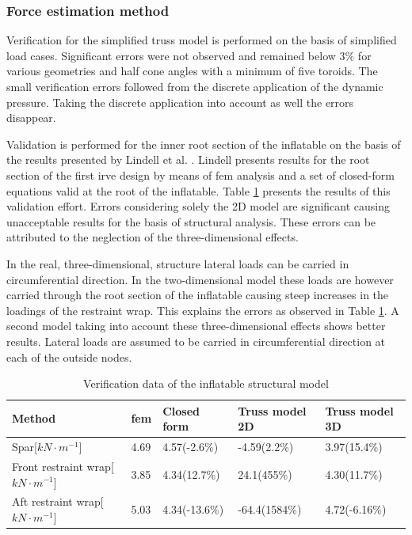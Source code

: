 \subsubsection{Force estimation method}

Verification for the simplified truss model is performed on the basis of simplified load cases. Significant errors were not observed and remained below $3\%$ for various geometries and half cone angles with a minimum of five toroids. The small verification errors followed from the discrete application of the dynamic pressure. Taking the discrete application into account as well the errors disappear.

Validation is performed for the inner root section of the inflatable on the basis of the results presented by Lindell et al. \cite{Lindell2006}. Lindell presents results for the root section of the first \gls{irve} design by means of \gls{fem} analysis and a set of closed-form equations valid at the root of the inflatable. Table \ref{tab:struc_val} presents the results of this validation effort. Errors considering solely the 2D model are significant causing unacceptable results for the basis of structural analysis. These errors can be attributed to the neglection of the three-dimensional effects. 

In the real, three-dimensional, structure lateral loads can be carried in circumferential direction. In the two-dimensional model these loads are however carried through the root section of the inflatable causing steep increases in the loadings of the restraint wrap. This explains the errors as observed in Table \ref{tab:struc_val}. A second model taking into account these three-dimensional effects shows better results. Lateral loads are assumed to be carried in circumferential direction at each of the outside nodes. 

\begin{table}[h]
\caption{Verification data of the inflatable structural model}
\hspace{-5mm}
\begin{tabular}{|l|l|l|l|l|} \hline
Method                            & \gls{fem}\cite{Lindell2006} & Closed form\cite{Lindell2006} & Truss model 2D & Truss model 3D \\ \hline \hline
Spar[$kN\cdot m^{-1}$]& 4.69                     & 4.57(-2.6\%)                     & -4.59(2.2\%)   & 3.97(15.4\%)   \\ \hline
Front restraint wrap[$kN\cdot m^{-1}$]& 3.85                     & 4.34(12.7\%)                     & 24.1(455\%)    & 4.30(11.7\%)   \\ \hline
Aft restraint wrap[$kN\cdot m^{-1}$]& 5.03                     & 4.34(-13.6\%)                    & -64.4(1584\%)  & 4.72(-6.16\%) \\ \hline
\end{tabular}
\label{tab:struc_val} 
\end{table}


